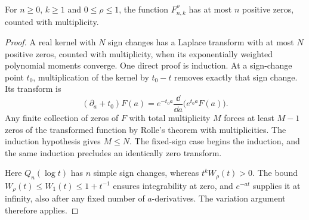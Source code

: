 \begin{lemma}\label{mesh:lem:zeros}
For $n\geq0$, $k\geq1$ and $0\leq\rho\leq1$, the function
$F_{n,k}^\rho$ has at most $n$ positive zeros, counted with multiplicity.
\end{lemma}
\begin{proof}
A real kernel with $N$ sign changes has a Laplace transform with at
most $N$ positive zeros, counted with multiplicity, when its exponentially
weighted polynomial moments converge. One direct proof is induction.
At a sign-change point $t_0$, multiplication of the kernel by $t_0-t$
removes exactly that sign change. Its transform is
\[
 (\partial_a+t_0)F(a)
  =e^{-t_0a}\frac{\dd}{\dd a}\bigl(e^{t_0a}F(a)\bigr).
\]
Any finite collection of zeros of $F$ with total multiplicity $M$
forces at least $M-1$ zeros of the transformed function by Rolle's
theorem with multiplicities. The induction hypothesis gives $M\leq N$.
The fixed-sign case begins the induction, and the same induction
precludes an identically zero transform.

Here $Q_n(\log t)$ has $n$ simple sign changes, whereas
$t^kW_\rho(t)>0$. The bound
$W_\rho(t)\leq W_1(t)\leq1+t^{-1}$ ensures integrability at zero,
and $e^{-at}$ supplies it at infinity, also after any fixed number
of $a$-derivatives. The variation argument therefore applies.
\end{proof}

